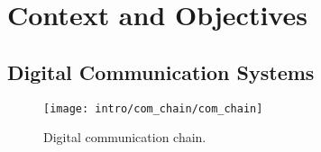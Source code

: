 
\graphicspath{{main/chapter1/fig/}}

\chapter{Context and Objectives}

\vspace*{\fill}
\minitoccustom
\vspace*{\fill}

\section{Digital Communication Systems}


\begin{figure}[htp]
  \centering
  \texttt{[image: intro/com\_chain/com\_chain]}
  \caption{Digital communication chain.}
  \label{fig:intro_com_chain}
\end{figure}

